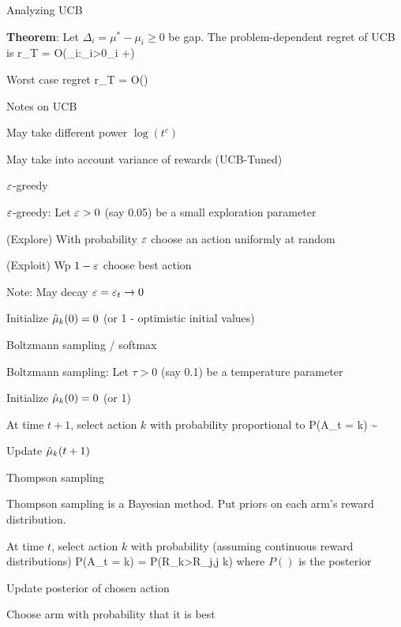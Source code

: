 \documentclass[english]{article}
\begin{document}
\item {Analyzing UCB}
\bitem 
\item {\bf Theorem}: Let $\Delta_i = \mu^*-\mu_i\ge 0$ be gap. The problem-dependent regret of UCB is 
\beqs
r_T = O\left(\sum_{i:\Delta_i>0}\Delta_i +\right)
\eeqs
\item Worst case regret
\beqs
r_T  = O() 
\eeqs
\eitem



\item {Notes on UCB}
\bitem
\item May take different power $\log (t^c)$
\item May take into account variance of rewards (UCB-Tuned)
\eitem



\item {$\varepsilon$-greedy}
\bitem 
\item $\varepsilon$-greedy: Let $\varepsilon>0$ (say 0.05) be a small exploration parameter
\benum
\item (Explore) With probability $\varepsilon$ choose an action uniformly at random
\item (Exploit) Wp $1-\varepsilon$ choose best action
\eenum
\item Note: May decay $\varepsilon  = \varepsilon_t \to 0$
\item Initialize $\hat{\mu}_k(0)=0$ (or 1 - optimistic initial values)
\eitem




\item {Boltzmann sampling / softmax}
\bitem 
\item Boltzmann sampling: Let $\tau>0$ (say 0.1) be a temperature parameter
\benum
\item Initialize $\hat{\mu}_k(0)=0$ (or 1)
\item At time $t+1$, select action $k$ with probability proportional to 
\beqs P(A_t = k) \sim \exp{}\eeqs
\item Update $\hat{\mu}_k(t+1)$
\eenum
\eitem




\item {Thompson sampling}
\bitem 
\item Thompson sampling is a Bayesian method. Put priors on each arm's reward distribution. 
\benum 
\item At time $t$, select action $k$ with probability (assuming continuous reward distributions)
\beqs P(A_t = k) = P(R_k>R_j,\forall j \neq k)\eeqs
where $P()$ is the posterior
\item Update posterior of chosen action
\eenum
\item Choose arm with probability that it is best
\eitem
\end{document}
